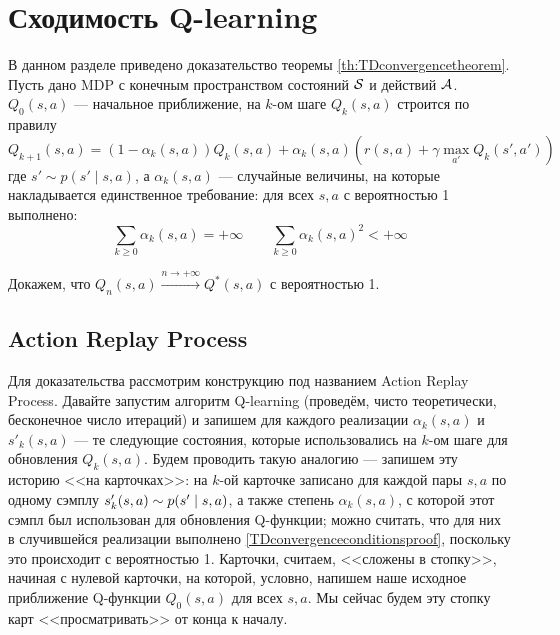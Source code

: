 \section{Сходимость Q-learning}\label{appendix:qlearning}

В данном разделе приведено доказательство теоремы \ref{th:TDconvergencetheorem}. Пусть дано MDP с конечным пространством состояний $\mathcal{S}$ и действий $\mathcal{A}$. $Q_0(s, a)$ --- начальное приближение, на $k$-ом шаге $Q_k(s, a)$ строится по правилу
\begin{equation}\label{Qlearningupdateproof}
Q_{k+1}(s, a) = (1 - \alpha_k(s, a))Q_k(s, a) + \alpha_k(s, a) \left( r(s, a) + \gamma \max_{a'} Q_k(s', a')\right)
\end{equation}
где $s' \sim p(s' \mid s, a)$, а $\alpha_k(s, a)$ --- случайные величины, на которые накладывается единственное требование: для всех $s, a$ с вероятностью 1 выполнено:
\begin{equation}\label{TDconvergenceconditionsproof}
\sum_{k \ge 0} \alpha_k(s, a) = +\infty \qquad \sum_{k \ge 0} \alpha_k(s, a)^2 < +\infty
\end{equation}

Докажем, что $Q_n(s, a) \xrightarrow{ n \to +\infty } Q^*(s, a)$ с вероятностью 1.

\subsection{Action Replay Process}

Для доказательства рассмотрим конструкцию под названием Action Replay Process. Давайте запустим алгоритм Q-learning (проведём, чисто теоретически, бесконечное число итераций) и запишем для каждого реализации $\alpha_k(s, a)$ и $s'_k(s, a)$ --- те следующие состояния, которые использовались на $k$-ом шаге для обновления $Q_k(s, a)$. Будем проводить такую аналогию --- запишем эту историю <<на карточках>>: на $k$-ой карточке записано для каждой пары $s, a$ по одному сэмплу $s'_k(s, a) \HM\sim p(s' \HM\mid s, a)$, а также степень $\alpha_k(s, a)$, с которой этот сэмпл был использован для обновления Q-функции; можно считать, что для них в случившейся реализации выполнено \eqref{TDconvergenceconditionsproof}, поскольку это происходит с вероятностью 1. Карточки, считаем, <<сложены в стопку>>, начиная с нулевой карточки, на которой, условно, напишем наше исходное приближение Q-функции $Q_0(s, a)$ для всех $s, a$. Мы сейчас будем эту стопку карт <<просматривать>> от конца к началу.

